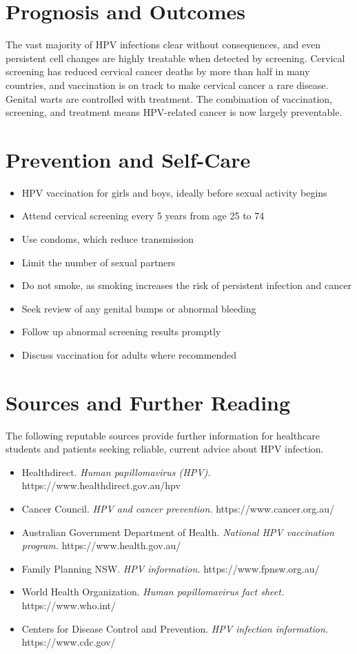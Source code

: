 \section*{Prognosis and Outcomes}
The vast majority of HPV infections clear without consequences, and even persistent cell changes are highly treatable when detected by screening. Cervical screening has reduced cervical cancer deaths by more than half in many countries, and vaccination is on track to make cervical cancer a rare disease. Genital warts are controlled with treatment. The combination of vaccination, screening, and treatment means HPV-related cancer is now largely preventable.

\section*{Prevention and Self-Care}
\begin{itemize}
    \item HPV vaccination for girls and boys, ideally before sexual activity begins
    \item Attend cervical screening every 5 years from age 25 to 74
    \item Use condoms, which reduce transmission
    \item Limit the number of sexual partners
    \item Do not smoke, as smoking increases the risk of persistent infection and cancer
    \item Seek review of any genital bumps or abnormal bleeding
    \item Follow up abnormal screening results promptly
    \item Discuss vaccination for adults where recommended
\end{itemize}

\section*{Sources and Further Reading}
The following reputable sources provide further information for healthcare students and patients seeking reliable, current advice about HPV infection.

\begin{itemize}
    \item Healthdirect. \textit{Human papillomavirus (HPV).} https://www.healthdirect.gov.au/hpv
    \item Cancer Council. \textit{HPV and cancer prevention.} https://www.cancer.org.au/
    \item Australian Government Department of Health. \textit{National HPV vaccination program.} https://www.health.gov.au/
    \item Family Planning NSW. \textit{HPV information.} https://www.fpnsw.org.au/
    \item World Health Organization. \textit{Human papillomavirus fact sheet.} https://www.who.int/
    \item Centers for Disease Control and Prevention. \textit{HPV infection information.} https://www.cdc.gov/
\end{itemize}
